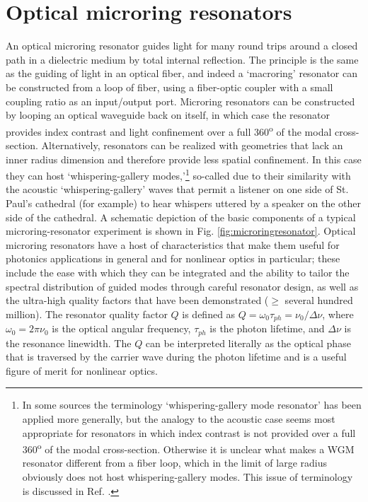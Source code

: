  
 \section{Optical microring resonators} \label{sec:OMRR}
An optical microring resonator guides light for many round trips around a closed path in a dielectric medium by total internal reflection. The principle is the same as the guiding of light in an optical fiber, and indeed a `macroring' resonator can be constructed from a loop of fiber, using a fiber-optic coupler with a small coupling ratio as an input/output port. Microring resonators can be constructed by looping an optical waveguide back on itself, in which case the resonator provides index contrast and light confinement over a full 360\textsuperscript{o} of the modal cross-section. Alternatively, resonators can be realized with geometries that lack an inner radius dimension and therefore provide less spatial confinement. In this case they can host `whispering-gallery modes,'\footnote{In some sources the terminology `whispering-gallery mode resonator' has been applied more generally, but the analogy to the acoustic case seems most appropriate for resonators in which index contrast is not provided over a full 360\textsuperscript{o} of the modal cross-section. Otherwise it is unclear what makes a WGM resonator different from a fiber loop, which in the limit of large radius obviously does not host whispering-gallery modes. This issue of terminology is discussed in Ref. \cite{Ilchenko2006}.} so-called due to their similarity with the acoustic `whispering-gallery' waves that permit a listener on one side of St. Paul's cathedral (for example) to hear whispers uttered by a speaker on the other side of the cathedral. A schematic depiction of the basic components of a typical microring-resonator experiment is shown in Fig. \ref{fig:microringresonator}. Optical microring resonators have a host of characteristics that make them useful for photonics applications in general and for nonlinear optics in particular; these include the ease with which they can be integrated and the ability to tailor the spectral distribution of guided modes through careful resonator design, as well as the ultra-high quality factors that have been demonstrated ($\geq$ several hundred million). The resonator quality factor $Q$ is defined as $Q=\omega_0 \tau_{ph}=\nu_0/\Delta\nu$, where $\omega_0=2\pi\nu_0$ is the optical angular frequency, $\tau_{ph}$ is the photon lifetime, and $\Delta\nu$ is the resonance linewidth. The $Q$ can be interpreted literally as the optical phase that is traversed by the carrier wave during the photon lifetime and is a useful figure of merit for nonlinear optics.

